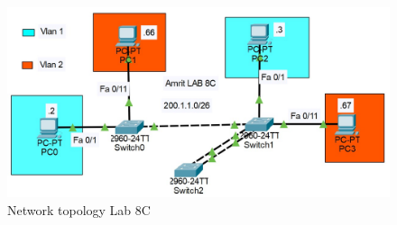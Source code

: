 \documentclass[a4paper,11pt]{article}
\begin{document}
\begin{figure}[H]
    \centering
    \includegraphics[scale=0.68,cframe=blue 0.5pt 3pt]{./FIG/Lab8C.jpg}
    \caption{Network topology Lab 8C}
\end{figure}
\end{document}
